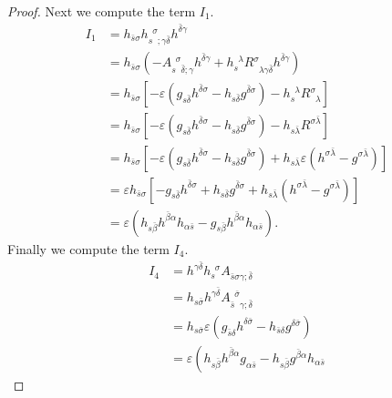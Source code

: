 \documentclass{amsart}
\theoremstyle{definition}
\numberwithin{equation}{section}
\begin{document}
\begin{proof}
Next we compute the term $I_1$.
\begin{align*}
I_1 
&=
	h_{\bar{s}\sigma}h{_{{s}\phantom{{\sigma}}{;\gamma\bar\delta}}^{\phantom{{s}}{\sigma}}}h^{\bar\delta\gamma} 
	\\
	&=
	h_{\bar{s}\sigma}
	{\left({
		-A{_{{s}\phantom{{\sigma}}{\bar\delta;\gamma}}^{\phantom{{s}}{\sigma}}}h^{\bar\delta\gamma} 
		+h{_{{s}\phantom{{\lambda}}{}}^{\phantom{{s}}{\lambda}}}R{_{{}\phantom{{\sigma}}{\lambda\gamma\bar\delta}}^{\phantom{{}}{\sigma}}}
		h^{\bar\delta\gamma}
	}\right)} 
	\\
&=
	h_{\bar{s}\sigma}
	{\left[{
		-\varepsilon
		{\left({
			g_{s\bar\delta}h^{\bar\delta\sigma}
			-h_{s\bar\delta}g^{\bar\delta\sigma}
		}\right)}
		-h{_{{s}\phantom{{\lambda}}{}}^{\phantom{{s}}{\lambda}}}R{_{{}\phantom{{\sigma}}{\lambda}}^{\phantom{{}}{\sigma}}}
	}\right]}
	\\
&=
	h_{\bar{s}\sigma}
	{\left[{
		-\varepsilon
		{\left({
			g_{s\bar\delta}h^{\bar\delta\sigma}
			-h_{s\bar\delta}g^{\bar\delta\sigma}
		}\right)}
		-h_{s\bar\lambda}R^{\sigma\bar\lambda}
	}\right]}
	\\
&=
	h_{\bar{s}\sigma}
	{\left[{
		-\varepsilon
		{\left({
			g_{s\bar\delta}h^{\bar\delta\sigma}
			-h_{s\bar\delta}g^{\bar\delta\sigma}
		}\right)}
		+h_{s\bar\lambda}\varepsilon
		{\left({h^{\sigma\bar\lambda}-g^{\sigma\bar\lambda}
		}\right)}
	}\right]}
	\\
&=
	\varepsilon
	h_{\bar{s}\sigma}
	{\left[{
		-g_{s\bar\delta}h^{\bar\delta\sigma}
		+h_{s\bar\delta}g^{\bar\delta\sigma}
		+
		h_{s\bar\lambda}{\left({
			h^{\sigma\bar\lambda}-g^{\sigma\bar\lambda}
		}\right)}
	}\right]}
	\\
&=
	\varepsilon{\left({
	h_{s\bar\beta}h^{\bar\beta\alpha}h_{\alpha\bar s}
	-
	g_{s\bar\beta}h^{\bar\beta\alpha}h_{\alpha\bar s}
	}\right)}.
\end{align*}
Finally we compute the term $I_4$.
\begin{align*}
I_4
&=
	h^{\gamma\bar\delta}h{_{{s}\phantom{{\sigma}}{}}^{\phantom{{s}}{\sigma}}}A_{\bar{s}\sigma\gamma;\bar\delta}
	\\
&=
	h_{s\bar\sigma}
	h^{\gamma\bar\delta}A{_{{\bar{s}}\phantom{{\bar\sigma}}{\gamma;\bar\delta}}^{\phantom{{\bar{s}}}{\bar\sigma}}}
	\\
&=
	h_{s\bar\sigma}
	\varepsilon{\left({
		g_{\bar s\delta}h^{\delta\bar\sigma}
		-h_{\bar s\delta}g^{\delta\bar\sigma}
	}\right)}
	\\
&=
	\varepsilon{\left({
	h_{s\bar\beta}h^{\bar\beta\alpha}g_{\alpha\bar s}
	-
	h_{s\bar\beta}g^{\bar\beta\alpha}h_{\alpha\bar s}
}}
\end{align*}
\end{proof}
\end{document}
